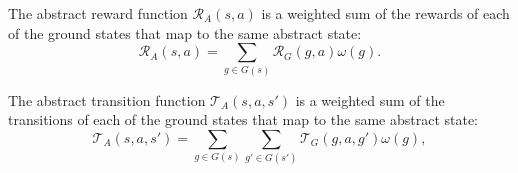 The abstract reward function $\mathcal{R}_A(s,a)$ is a weighted sum of the rewards of each of the ground states that map to the same abstract state:
\begin{equation}
\mathcal{R}_A(s,a) = \sum_{g \in G(s)} \mathcal{R}_G(g,a) \omega(g) .
\end{equation}
\edefn

The abstract transition function $\mathcal{T}_A(s,a,s')$ is a weighted sum of the transitions of each of the ground states that map to the same abstract state:
\begin{equation}
\mathcal{T}_A(s,a,s') = \sum_{g \in G(s)} \sum_{g' \in G(s')} \mathcal{T}_G(g,a,g') \omega(g),
\end{equation}
\edefn












